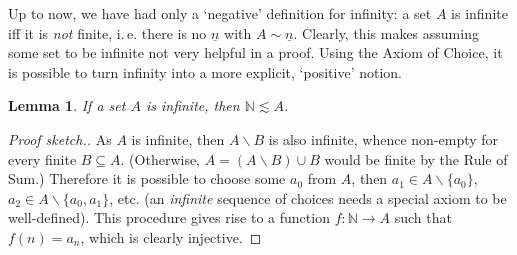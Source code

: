 \documentclass[12pt,notitlepage]{article}
\theoremstyle{plain}
\newtheorem{lemma}[thm]{Lemma}
\theoremstyle{definition}
\newtheorem{exm}[thm]{Example}
\newtheorem{rem}[thm]{Remark}
\theoremstyle{plain}
\newcommand{\N}{\mathbb{N}}
\newcommand{\sbs}{\subseteq}
\renewcommand{\setminus}{\smallsetminus}
\newcommand{\void}{\varnothing}
\newcommand{\mP}{\mathcal{P}}
\newcommand{\ul}[1]{\underline{#1}}
\newcommand{\1}{\mathbf{1}}
\newcommand{\0}{\mathbf{0}}
\begin{document}
%
%
%

\medskip

Up to now, we have had only a `negative' definition for infinity: a set $A$ is infinite iff it is \emph{not} finite, i.\,e. there is no $\ul{n}$ with $A \sim \ul{n}$. Clearly, this makes assuming some set to be infinite not very helpful in a proof. Using the Axiom of Choice, it is possible to turn infinity into a more explicit, `positive' notion.

\begin{lemma}\label{L10:min_inf}
If a set $A$ is infinite, then $\N \lesssim A$.
\end{lemma}
\begin{proof}[Proof sketch.]
As $A$ is infinite, then $A \setminus B$ is also infinite, whence non-empty for every finite $B \sbs A$. (Otherwise, $A = (A \setminus B) \cup B$ would be finite by the Rule of Sum.) Therefore it is possible to choose some $a_0$ from $A$, then $a_1 \in A \setminus \{ a_0 \}$, $a_2 \in A \setminus \{ a_0, a_1 \}$, etc. (an \emph{infinite} sequence of choices needs a special axiom to be well-defined). This procedure gives rise to a function $f\colon \N\to A$ such that $f(n) = a_n$, which is clearly injective.

\end{proof}
\end{document}

